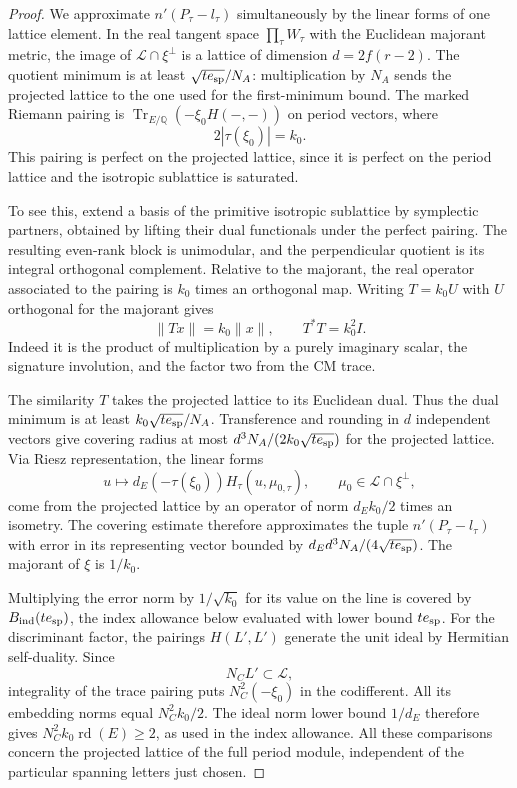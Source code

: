 \begin{proof}
We approximate \(n'(P_\tau-l_\tau)\) simultaneously by the
linear forms of one lattice element. In the real tangent
space \(\prod_\tau W_\tau\) with the Euclidean majorant metric,
the image of \(\mathcal L\cap\xi^\perp\) is a lattice of
dimension \(d=2f(r-2)\). The quotient minimum is at least
\(\sqrt{t e_{\rm sp}}/N_A\): multiplication by \(N_A\) sends
the projected lattice to the one used for the first-minimum bound.
The marked Riemann pairing is
\(\operatorname{Tr}_{E/\mathbb Q}(-\xi_0 H(-,-))\) on period
vectors, where 
\[
  2|\tau(\xi_0)|=k_0.
\]
This pairing is perfect on the projected lattice, since it is
perfect on the period lattice and the isotropic sublattice is
saturated.

To see this, extend a basis of the primitive
isotropic sublattice by symplectic partners, obtained by lifting
their dual functionals under the perfect pairing. The resulting
even-rank block is unimodular, and the perpendicular quotient
is its integral orthogonal complement.
Relative to the majorant, the real operator associated to the
pairing is \(k_0\) times an orthogonal map.
Writing \(T=k_0 U\) with \(U\) orthogonal for the majorant gives
\[
  \|Tx\|=k_0\|x\|,\qquad T^*T=k_0^2I .
\]
 Indeed it is the
product of multiplication by a purely imaginary scalar,
the signature involution, and the factor two from the CM trace.

The similarity \(T\) takes the projected lattice to its Euclidean dual.
Thus the dual minimum is at least \(k_0\sqrt{t e_{\rm sp}}/N_A\).
Transference and rounding in \(d\) independent vectors give
covering radius at most
\(d^3N_A/(2k_0\sqrt{t e_{\rm sp}})\) for the projected lattice.
Via Riesz representation, the linear forms
\[
 u\longmapsto d_E(-\tau(\xi_0)) H_\tau(u,\mu_{0,\tau}),
 \qquad \mu_0\in\mathcal L\cap\xi^\perp ,
\]
come from the projected lattice by an operator of norm
\(d_Ek_0/2\) times an isometry. The covering estimate
therefore approximates the tuple \(n'(P_\tau-l_\tau)\)
with error in its representing vector bounded by
\(d_Ed^3N_A/(4\sqrt{t e_{\rm sp}})\).
The majorant of \(\xi\) is \(1/k_0\).

Multiplying the error
norm by \(1/\sqrt{k_0}\) for its value on the line is
covered by \(B_{\rm ind}(t e_{\rm sp})\), the index allowance
below evaluated with lower bound \(t e_{\rm sp}\).
For the discriminant factor, the pairings \(H(L',L')\)
generate the unit ideal by Hermitian self-duality.
Since 
\[
  N_C L'\subset\mathcal L,
\]
 integrality of the trace
pairing puts \(N_C^2(-\xi_0)\) in the codifferent. All its
embedding norms equal \(N_C^2 k_0/2\). The ideal norm lower
bound \(1/d_E\) therefore gives
\(N_C^2 k_0\operatorname{rd}(E)\ge2\), as used in the index
allowance.
All these comparisons concern the projected lattice of the
full period module, independent of the particular spanning
letters just chosen.


\end{proof}
